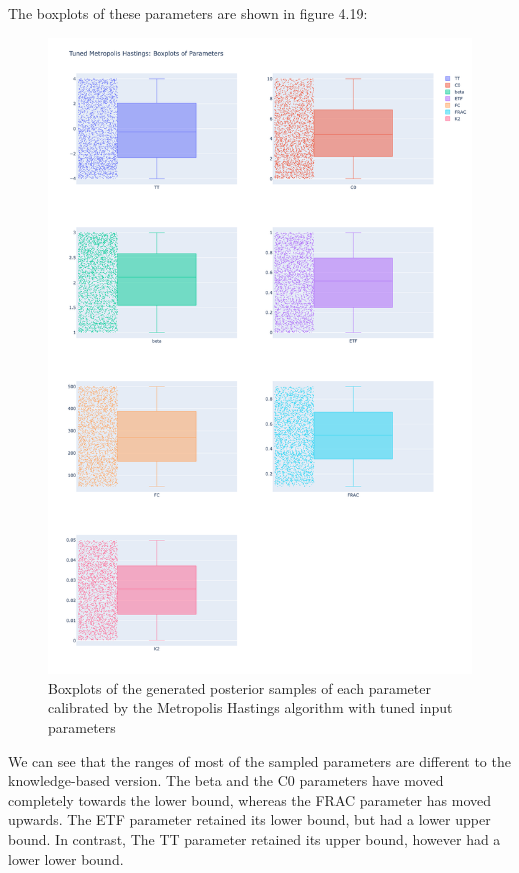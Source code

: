 The boxplots of these parameters are shown in figure 4.19:

\begin{figure}
    \centering
    \includegraphics[width=1\textwidth]{figures/basic_mh/tuned_mh/tuned_mh_boxplot.png}
    \captionsetup{width=.8\textwidth}
    \caption{Boxplots of the generated posterior samples of each parameter calibrated by the Metropolis Hastings algorithm with tuned input parameters}
    \label{fig:enter-label}
\end{figure}

We can see that the ranges of most of the sampled parameters are different to the knowledge-based version. The beta and the C0 parameters have moved completely towards the lower bound, whereas the FRAC parameter has moved upwards. The ETF parameter retained its lower bound, but had a lower upper bound. In contrast, The TT parameter retained its upper bound, however had a lower lower bound.

